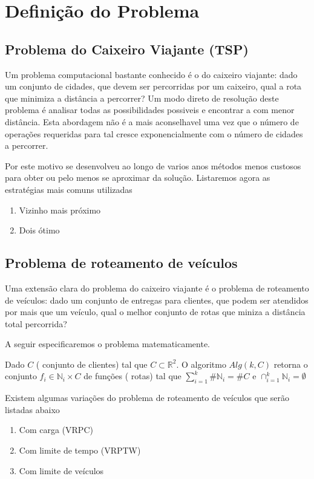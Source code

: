 \documentclass[a4paper,12pt]{book}
\begin{document}
\chapter{Definição do Problema}

\section{Problema do Caixeiro Viajante (TSP)}

	Um problema computacional bastante conhecido é o do caixeiro viajante: dado um conjunto de
cidades, que devem ser percorridas por um caixeiro, qual a rota que minimiza a distância a
percorrer?
	Um modo direto de resolução deste problema é analisar todas as possibilidades possiveis e
encontrar a com menor distância. Esta abordagem não é a mais aconselhavel uma vez que o número de
operações requeridas para tal cresce exponencialmente com o número de cidades a percorrer.

	Por este motivo se desenvolveu ao longo de varios anos métodos menos custosos para obter ou pelo
menos se aproximar da solução. Listaremos agora as estratégias mais comuns utilizadas

\begin{enumerate}
\item Vizinho mais próximo
\item Dois ótimo
\end{enumerate}


\section{Problema de roteamento de veículos}

	Uma extensão clara do problema do caixeiro viajante é o problema de roteamento de veículos: dado
um conjunto de entregas para clientes, que podem ser atendidos por mais que um veículo, qual o
melhor conjunto de rotas que miniza a distância total percorrida?

	A seguir especificaremos o problema matematicamente.

	Dado $C$ ( conjunto de clientes) tal que $C \subset \mathbb{R}^2$. O algoritmo $Alg(k,C)$
retorna o conjunto $f_i \in \mathbb{N}_i\times C$ de funções ( rotas) tal que $\sum_{i=1}^k\#
\mathbb{N}_i = \#C$ e $\cap_{i=1}^k \mathbb{N}_i= \emptyset$

	Existem algumas variações do problema de roteamento de veículos que serão listadas abaixo
\begin{enumerate}
\item Com carga (VRPC)
\item Com limite de tempo (VRPTW)
\item Com limite de veículos
\end{enumerate}
\end{document}
